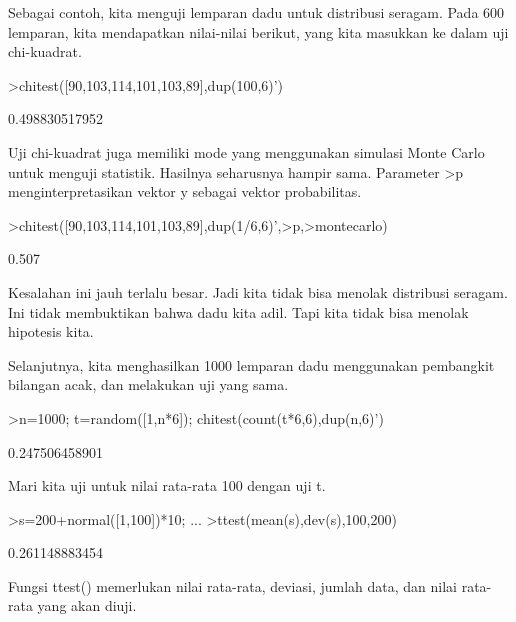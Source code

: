\documentclass[a4paper,10pt]{article}
\begin{document}
\begin{eulernotebook}
\begin{eulercomment}
Sebagai contoh, kita menguji lemparan dadu untuk distribusi seragam.
Pada 600 lemparan, kita mendapatkan nilai-nilai berikut, yang kita
masukkan ke dalam uji chi-kuadrat.
\end{eulercomment}
\begin{eulerprompt}
>chitest([90,103,114,101,103,89],dup(100,6)')
\end{eulerprompt}
\begin{euleroutput}
  0.498830517952
\end{euleroutput}
\begin{eulercomment}
Uji chi-kuadrat juga memiliki mode yang menggunakan simulasi Monte
Carlo untuk menguji statistik. Hasilnya seharusnya hampir sama.
Parameter \textgreater{}p menginterpretasikan vektor y sebagai vektor probabilitas.
\end{eulercomment}
\begin{eulerprompt}
>chitest([90,103,114,101,103,89],dup(1/6,6)',>p,>montecarlo)
\end{eulerprompt}
\begin{euleroutput}
  0.507
\end{euleroutput}
\begin{eulercomment}
Kesalahan ini jauh terlalu besar. Jadi kita tidak bisa menolak
distribusi seragam. Ini tidak membuktikan bahwa dadu kita adil. Tapi
kita tidak bisa menolak hipotesis kita.

Selanjutnya, kita menghasilkan 1000 lemparan dadu menggunakan
pembangkit bilangan acak, dan melakukan uji yang sama.
\end{eulercomment}
\begin{eulerprompt}
>n=1000; t=random([1,n*6]); chitest(count(t*6,6),dup(n,6)')
\end{eulerprompt}
\begin{euleroutput}
  0.247506458901
\end{euleroutput}
\begin{eulercomment}
Mari kita uji untuk nilai rata-rata 100 dengan uji t.
\end{eulercomment}
\begin{eulerprompt}
>s=200+normal([1,100])*10; ...
>ttest(mean(s),dev(s),100,200)
\end{eulerprompt}
\begin{euleroutput}
  0.261148883454
\end{euleroutput}
\begin{eulercomment}
Fungsi ttest() memerlukan nilai rata-rata, deviasi, jumlah data, dan
nilai rata-rata yang akan diuji.


\end{eulercomment}
\end{eulernotebook}
\end{document}
